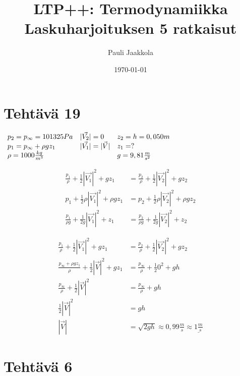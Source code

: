 \documentclass[12pt,a4paper,finnish]{article}
\title{LTP++: Termodynamiikka\\Laskuharjoituksen 5 ratkaisut}
\date{\today}
\author{Pauli Jaakkola}
\begin{document}
\maketitle
\tableofcontents
\newpage

\section{Tehtävä 19}

\begin{math}
 \begin{array}{l l l}
  p_2 = p_{\infty} = 101325 Pa & |\vec{V_2}| = 0 & z_2 = h = 0,050 m\\
  p_1 = p_{\infty} + \rho gz_1 & |\vec{V_1}| = |\vec{V}| & z_1 = ?\\
  \rho = 1000\frac{kg}{m^3} & & g = 9,81\frac{m}{s^2}
 \end{array}
\end{math}

\begin{framed}
  \begin{align}
    \frac{p_1}{\rho} + \frac{1}{2}|\vec{V_1}|^2 + gz_1 &= \frac{p_2}{\rho} + \frac{1}{2}|\vec{V_2}|^2 + gz_2\\
    p_1 + \frac{1}{2}\rho|\vec{V_1}|^2 + \rho gz_1 &= p_2 + \frac{1}{2}\rho|\vec{V_2}|^2 + \rho gz_2\\
    \frac{p_1}{\rho g} + \frac{1}{2g}|\vec{V_1}|^2 + z_1 &= \frac{p_2}{\rho g} + \frac{1}{2g}|\vec{V_2}|^2 + z_2
  \end{align}
\end{framed}

\begin{align}
 \frac{p_1}{\rho} + \frac{1}{2}|\vec{V_1}|^2 + gz_1 &= \frac{p_2}{\rho} + \frac{1}{2}|\vec{V_2}|^2 + gz_2\\
 \frac{p_{\infty} + \rho gz_1}{\rho} + \frac{1}{2}|\vec{V}|^2 + gz_1 &= \frac{p_{\infty}}{\rho} + \frac{1}{2}0^2 + gh\\
 \frac{p_{\infty}}{\rho} + \frac{1}{2}|\vec{V}|^2 &= \frac{p_{\infty}}{\rho} + gh\\
 \frac{1}{2}|\vec{V}|^2 &= gh\\
 |\vec{V}| &= \sqrt{2gh} \approx 0,99 \frac{m}{s} \approx \underline{1 \frac{m}{s}}
\end{align}

\section{Tehtävä 6}
\end{document}
